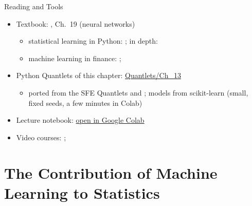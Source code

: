 \begin{frame}{Reading and Tools}
\itemsize{\small}
\begin{itemize}
    \item Textbook: , Ch.~19 (neural networks)
    \begin{itemize}
        \item statistical learning in Python: ; in depth: 
        \item machine learning in finance: ; 
    \end{itemize}
    \item Python Quantlets of this chapter: \href{https://github.com/danpele/SFM/tree/main/Quantlets/Ch_13}{Quantlets/Ch\_13}
    \begin{itemize}
        \item ported from the SFE Quantlets  and ; models from scikit-learn (small, fixed seeds, a few minutes in Colab)
    \end{itemize}
    \item Lecture notebook: \href{\colaburl{notebooks/EN/chapter13_lecture_notebook.ipynb}}{open in Google Colab}
    \item Video courses: ; 
\end{itemize}
\end{frame}


\section{The Contribution of Machine Learning to Statistics}

